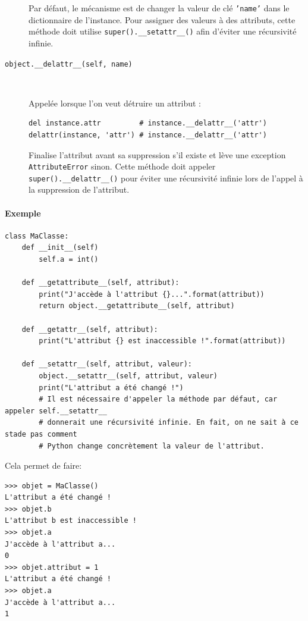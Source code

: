 \documentclass[a4paper, 10pt]{article}
\begin{document}
\begin{description}
    Par défaut, le mécanisme est de changer la valeur de clé \texttt{'name'} dans le dictionnaire de l'instance. Pour assigner des valeurs à des attributs, cette méthode doit utilise \texttt{super().__setattr__()} afin d'éviter une récursivité infinie.

    \item[\texttt{object.__delattr__(self, name)}]~

    Appelée lorsque l'on veut détruire un attribut : 
    \begin{verbatim}
del instance.attr         # instance.__delattr__('attr')
delattr(instance, 'attr') # instance.__delattr__('attr')
    \end{verbatim}
    
    Finalise l'attribut avant sa suppression s'il existe et lève une exception \texttt{AttributeError} sinon. Cette méthode doit appeler \texttt{super().__delattr__()} pour éviter une récursivité infinie lors de l'appel à la suppression de l'attribut.
\end{description}  


\paragraph{Exemple}
\begin{verbatim}
class MaClasse:
    def __init__(self)
        self.a = int()

    def __getattribute__(self, attribut):
        print("J'accède à l'attribut {}...".format(attribut))
        return object.__getattribute__(self, attribut)

    def __getattr__(self, attribut):
        print("L'attribut {} est inaccessible !".format(attribut))

    def __setattr__(self, attribut, valeur):
        object.__setattr__(self, attribut, valeur)
        print("L'attribut a été changé !")
        # Il est nécessaire d'appeler la méthode par défaut, car appeler self.__setattr__
        # donnerait une récursivité infinie. En fait, on ne sait à ce stade pas comment
        # Python change concrètement la valeur de l'attribut.
\end{verbatim}

Cela permet de faire:
\begin{verbatim}
>>> objet = MaClasse()
L'attribut a été changé !
>>> objet.b
L'attribut b est inaccessible !
>>> objet.a
J'accède à l'attribut a...
0
>>> objet.attribut = 1
L'attribut a été changé !
>>> objet.a
J'accède à l'attribut a...
1
\end{verbatim}
\end{document}
